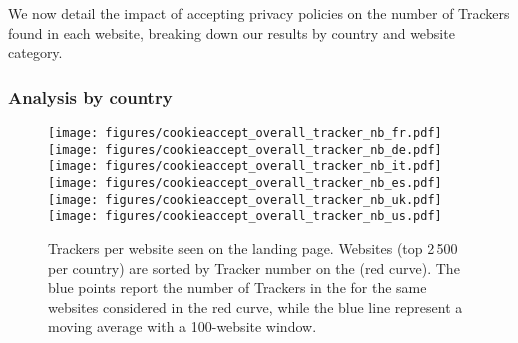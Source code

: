 We now detail the impact of accepting privacy policies on the number of Trackers found in each website, breaking down our results by country and website category.

\subsubsection{Analysis by country}
\label{sec:trackers_country}

\begin{figure*}
    \centering
    \texttt{[image: figures/cookieaccept\_overall\_tracker\_nb\_fr.pdf]}
    \texttt{[image: figures/cookieaccept\_overall\_tracker\_nb\_de.pdf]}
    \texttt{[image: figures/cookieaccept\_overall\_tracker\_nb\_it.pdf]}
    \texttt{[image: figures/cookieaccept\_overall\_tracker\_nb\_es.pdf]}
    \texttt{[image: figures/cookieaccept\_overall\_tracker\_nb\_uk.pdf]}
    \texttt{[image: figures/cookieaccept\_overall\_tracker\_nb\_us.pdf]}
	\caption{Trackers per website seen on the landing page. Websites (top 2\,500 per country) are sorted by Tracker number on the \BEFORE (red curve). The blue points report the number of Trackers in the \AFTER for the same websites considered in the red curve, while the blue line represent a moving average with a 100-website window.}
	\label{fig:ca_countries}
\end{figure*}

